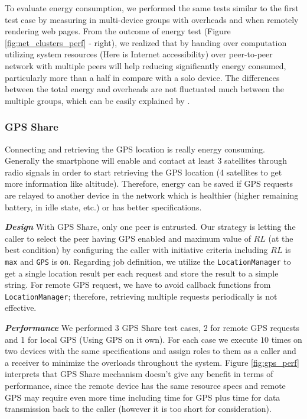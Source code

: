 \documentclass{sig-alternate}[10pt]
\begin{document}
To evaluate energy consumption, we performed the same tests similar to the first test case by measuring in multi-device groups with overheads and when remotely rendering web pages. From the outcome of energy test (Figure \ref{fig:net_clusters_perf} - right), we realized that by handing over computation utilizing system resources (Here is Internet accessibility) over peer-to-peer network with multiple peers will help reducing significantly energy consumed, particularly more than a half in compare with a solo device. The differences between the total energy and overheads are not fluctuated much between the multiple groups, which can be easily explained by \cite{wifi_energy}.\\

\subsubsection{GPS Share}
Connecting and retrieving the GPS location is really energy consuming. Generally the smartphone will enable and contact at least 3 satellites through radio signals in order to start retrieving the GPS location (4 satellites to get more information like altitude). Therefore, energy can be saved if GPS requests are relayed to another device in the network which is healthier (higher remaining battery, in idle state, etc.) or has better specifications.

\textbf{\emph{Design}}
With GPS Share, only one peer is entrusted. Our strategy is letting the caller to select the peer having GPS enabled and maximum value of $RL$ (at the best condition) by configuring the caller with initiative criteria including $RL$ is \texttt{max} and \texttt{GPS} is \texttt{on}. Regarding job definition, we utilize the \texttt{LocationManager} to get a single location result per each request and store the result to a simple string. For remote GPS request, we have to avoid callback functions from \texttt{LocationManager}; therefore, retrieving multiple requests periodically is not effective.


\textbf{\emph{Performance}}
We performed 3 GPS Share test cases, 2 for remote GPS requests and 1 for local GPS (Using GPS on it own). For each case we execute $10$ times on two devices with the same specifications and assign roles to them as a caller and a receiver to minimize the overloads throughout the system. Figure \ref{fig:gps_perf} interprets that GPS Share mechanism doesn't give any benefit in terms of performance, since the remote device has the same resource specs and remote GPS may require even more time including time for GPS plus time for data transmission back to the caller (however it is too short for consideration).
\end{document}
